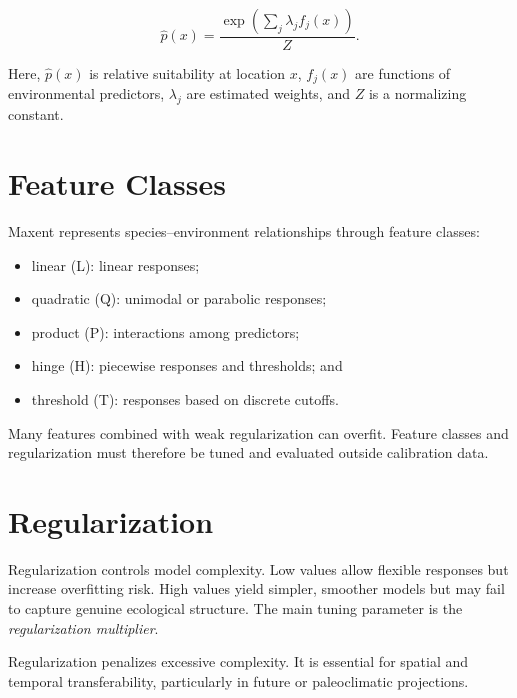 \begin{equationbox}
\[
\hat{p}(x)=\frac{\exp\left(\sum_j\lambda_j f_j(x)\right)}{Z}.
\]
\end{equationbox}

Here, $\hat p(x)$ is relative suitability at location $x$, $f_j(x)$ are
functions of environmental predictors, $\lambda_j$ are estimated weights, and
$Z$ is a normalizing constant.

\section{Feature Classes}

Maxent represents species--environment relationships through feature classes:
\begin{itemize}
  \item linear (L): linear responses;
  \item quadratic (Q): unimodal or parabolic responses;
  \item product (P): interactions among predictors;
  \item hinge (H): piecewise responses and thresholds; and
  \item threshold (T): responses based on discrete cutoffs.
\end{itemize}

\begin{atencao}[title={\faExclamationTriangle\quad Maxent complexity}]
Many features combined with weak regularization can overfit. Feature classes and
regularization must therefore be tuned and evaluated outside calibration data.
\end{atencao}

\section{Regularization}

Regularization controls model complexity. Low values allow flexible responses
but increase overfitting risk. High values yield simpler, smoother models but
may fail to capture genuine ecological structure. The main tuning parameter is
the \textit{regularization multiplier}.

\begin{conceito}[title={\faBook\quad Regularization}]
Regularization penalizes excessive complexity. It is essential for spatial and
temporal transferability, particularly in future or paleoclimatic projections.
\end{conceito}

